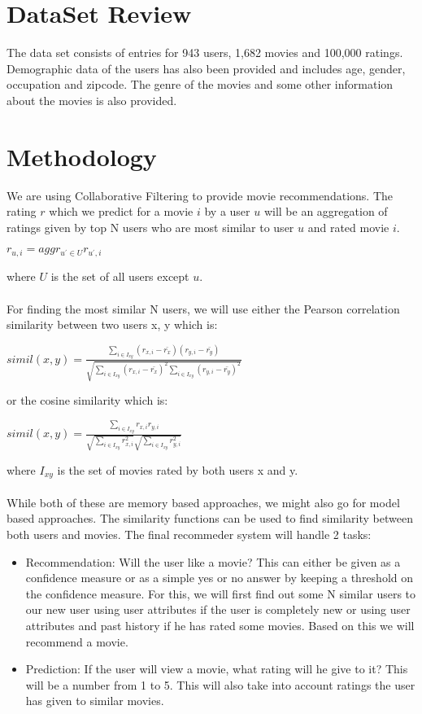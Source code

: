 \documentclass[pdftex,12pt,a4paper]{article}
\begin{document}
	\section{DataSet Review}
		The data set consists of entries for 943 users, 1,682 movies and 100,000 ratings. Demographic data of the users has also been provided and includes age, gender, occupation and zipcode. The genre of the movies and some other information about the movies is also provided.
	
	\section{Methodology}
		We are using Collaborative Filtering to provide movie recommendations. The rating $r$ which we predict for a movie $i$ by a user $u$ will be an aggregation of ratings given by top N users who are most similar to user $u$ and rated movie $i$.
		\begin{center}
			$r_{u,i} = aggr_{u^\prime \in U} r_{u^\prime, i}$
		\end{center}
		where $U$ is the set of all users except $u$.\\\\
		For finding the most similar N users, we will use either the Pearson correlation similarity between two users x, y which is:
		\begin{center}
			$simil(x,y) = \frac{\sum\limits_{i \in I_{xy}}(r_{x,i}-\bar{r_x})(r_{y,i}-\bar{r_y})}{\sqrt{\sum\limits_{i \in I_{xy}}(r_{x,i}-\bar{r_x})^2\sum\limits_{i \in I_{xy}}(r_{y,i}-\bar{r_y})^2}}$
		\end{center}
		or the cosine similarity which is:
		\begin{center}
			$simil(x,y) = \frac{\sum\limits_{i \in I_{xy}}r_{x,i}r_{y,i}}{\sqrt{\sum\limits_{i \in I_{xy}}r_{x,i}^2}\sqrt{\sum\limits_{i \in I_{xy}}r_{y,i}^2}}$
		\end{center}
		where $I_{xy}$ is the set of movies rated by both users x and y.\\\\
		While both of these are memory based approaches, we might also go for model based approaches. The similarity functions can be used to find similarity between both users and movies. The final recommeder system will handle 2 tasks:
		\begin{itemize}
			\item Recommendation: Will the user like a movie? This can either be given as a confidence measure or as a simple yes or no answer by keeping a threshold on the confidence measure. For this, we will first find out some N similar users to our new user using user attributes if the user is completely new or using user attributes and past history if he has rated some movies. Based on this we will recommend a movie.
			\item Prediction: If the user will view a movie, what rating will he give to it? This will be a number from 1 to 5. This will also take into account ratings the user has given to similar movies.
		\end{itemize}

	
	
\end{document}
